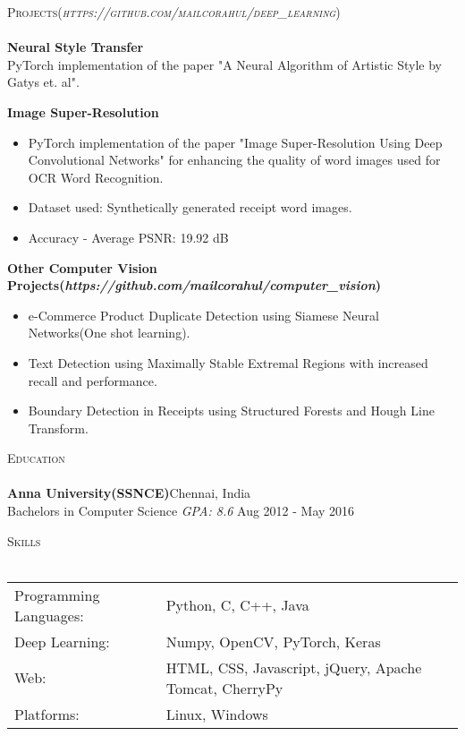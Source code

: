 \documentclass[a4paper]{article}
\newcommand{\lineunder} {
    \vspace*{-8pt} \\
    \hspace*{-18pt} \hrulefill \\
}
\newcommand{\header} [1] {
    {\hspace*{-18pt}\vspace*{6pt} \textsc{#1}}
    \vspace*{-6pt} \lineunder
}
\begin{document}
\header{Projects(\textit{https://github.com/mailcorahul/deep\_learning})}
{\textbf{Neural Style Transfer}}\\
PyTorch implementation of the paper "A Neural Algorithm of Artistic Style by Gatys et. al".\\
\vspace*{2mm}

{\textbf{Image Super-Resolution}}\\
\begin{itemize}
    \itemsep-0.5em
    \item PyTorch implementation of the paper "Image Super-Resolution Using Deep Convolutional Networks" for enhancing the quality of word images used for OCR Word Recognition.
    \item Dataset used: Synthetically generated receipt word images.
    \item Accuracy - Average PSNR: 19.92 dB
\end{itemize}

\vspace*{2mm}
{\textbf{Other Computer Vision Projects(\textit{https://github.com/mailcorahul/computer\_vision})}}
    \begin{itemize}
        \itemsep-0.5em
        \item e-Commerce Product Duplicate Detection using Siamese Neural Networks(One shot learning).
        \item Text Detection using Maximally Stable Extremal Regions with increased recall and performance.
        \item Boundary Detection in Receipts using Structured Forests and Hough Line Transform.\\
    \end{itemize}

\header{Education}
\textbf{Anna University(SSNCE)}\hfill Chennai, India\\
Bachelor\textquotesingle{}s in Computer Science \textit{GPA: 8.6} \hfill Aug 2012 - May 2016\\
\vspace{2mm}

\header{Skills}
\begin{tabular}{ l l }
    Programming Languages: & Python, C, C++, Java                                   \\
    Deep Learning:         & Numpy, OpenCV, PyTorch, Keras                          \\
    Web:                   & HTML, CSS, Javascript, jQuery, Apache Tomcat, CherryPy \\
    Platforms:             & Linux, Windows                                         \\
\end{tabular}
\vspace{2mm}
\end{document}
